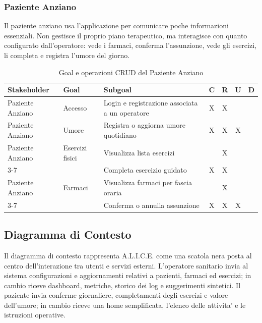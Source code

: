 \subsubsection{Paziente Anziano}

Il paziente anziano usa l'applicazione per comunicare poche informazioni essenziali. Non gestisce il proprio piano terapeutico, ma interagisce con quanto configurato dall'operatore: vede i farmaci, conferma l'assunzione, vede gli esercizi, li completa e registra l'umore del giorno.

\begin{table}[H]
\centering
\footnotesize
\renewcommand{\arraystretch}{1.25}
\begin{tabular}{|p{3.2cm}|p{4.2cm}|p{4.9cm}|c|c|c|c|}
\hline
\textbf{Stakeholder} & \textbf{Goal} & \textbf{Subgoal} & \textbf{C} & \textbf{R} & \textbf{U} & \textbf{D} \\
\hline
Paziente Anziano & Accesso & Login e registrazione associata a un operatore & X & X & & \\
\hline
Paziente Anziano & Umore & Registra o aggiorna umore quotidiano & X & X & X & \\
\hline
Paziente Anziano & Esercizi fisici & Visualizza lista esercizi & & X & & \\
\cline{3-7}
 & & Completa esercizio guidato & X & X & & \\
\hline
Paziente Anziano & Farmaci & Visualizza farmaci per fascia oraria & & X & & \\
\cline{3-7}
 & & Conferma o annulla assunzione & X & X & X & \\
\hline
\end{tabular}
\caption{Goal e operazioni CRUD del Paziente Anziano}
\label{tab:goal-paziente}
\end{table}

\newpage
\subsection{Diagramma di Contesto}

Il diagramma di contesto rappresenta A.L.I.C.E. come una scatola nera posta al centro dell'interazione tra utenti e servizi esterni. L'operatore sanitario invia al sistema configurazioni e aggiornamenti relativi a pazienti, farmaci ed esercizi; in cambio riceve dashboard, metriche, storico dei log e suggerimenti sintetici. Il paziente invia conferme giornaliere, completamenti degli esercizi e valore dell'umore; in cambio riceve una home semplificata, l'elenco delle attivita' e le istruzioni operative.

